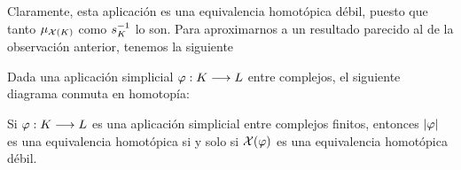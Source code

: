 Claramente, esta aplicación es una equivalencia homotópica débil, puesto que tanto $\mu_{\mathcal{X}(K)}$ como $s_K^{-1} $ lo son. Para aproximarnos a un resultado parecido al de la observación anterior, tenemos la siguiente

\begin{proposition}
  Dada una aplicación simplicial $\varphi:K\longrightarrow L$ entre complejos, el siguiente diagrama conmuta en homotopía:
  \begin{center}
  \end{center}
\end{proposition}


\begin{corollary}
  Si $ \varphi:K\longrightarrow L $ es una aplicación simplicial entre complejos finitos, entonces $ \abs{\varphi } $ es una equivalencia homotópica si y solo si $ \mathcal{X}(\varphi) $ es una equivalencia homotópica débil.
\end{corollary}




